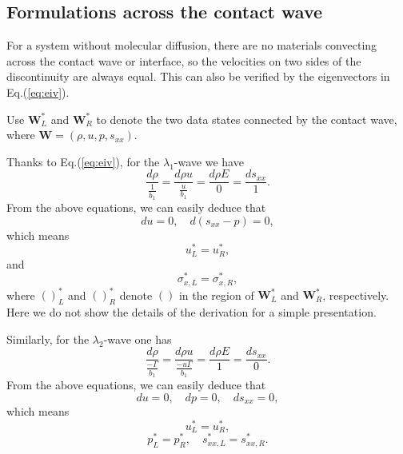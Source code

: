 \documentclass[review]{elsarticle}
\begin{document}
\subsection{Formulations across the  contact wave}
  For  a  system without molecular diffusion, there are  no materials convecting  across the contact wave or interface, so the velocities on two sides of  the discontinuity are always equal. %
  This can also be verified by the eigenvectors  in Eq.(\ref{eq:eiv}).

Use $\mathbf{W}_L^*$ and $\mathbf{W}_R^*$ to denote the two data states connected by the contact wave, where $\mathbf{W}=\left(\rho,u,p,s_{xx}\right)$.

Thanks to Eq.(\ref{eq:eiv}), for the $\lambda_{1}$-wave we
have
\begin{equation}   \label{e23a}
\frac{d \rho}{\frac{1}{b_{1}}} = \frac{d \rho u}{\frac{u
}{b_{1}}}=\frac{d \rho E}{0} = \frac{d s_{xx}}{1}.
\end{equation}
From the above equations, we can easily deduce that
\begin{equation}   \label{e23b}
du = 0, \quad d(s_{xx}-p)=0,
\end{equation}
 which means
\begin{equation}   \label{e23c}
  u_{L}^{\ast}=u_{R}^{\ast},
\end{equation}
and
\begin{equation}   \label{e23d}
\sigma_{x,L}^{\ast}=\sigma_{x,R}^{\ast},
\end{equation}
where $()_{L}^{\ast}$ and $()_{R}^{\ast}$ denote $()$ in the region
of $\mathbf{W}_{L}^{\ast}$ and $\mathbf{W}_{R}^{\ast}$,
respectively. Here we do not show the details of the derivation for a simple
 presentation.


Similarly, for the $\lambda_{2}$-wave one
has
\begin{equation}   \label{e24a}
\frac{d \rho}{\frac{-\Gamma}{b_{1}}} = \frac{d \rho u}{\frac{-u
\Gamma}{b_{1}}}=\frac{d \rho E}{1} = \frac{d s_{xx}}{0}.
\end{equation}
From the above equations, we can easily deduce  that
\begin{equation}   \label{e24b}
du = 0, \quad dp=0, \quad ds_{xx}=0,
\end{equation}
 which means
\begin{equation}   \label{e24c}
  u_{L}^{\ast}=u_{R}^{\ast},
\end{equation}
\begin{equation}   \label{e24d}
p_{L}^{\ast}=p_{R}^{\ast}, \quad
  s_{xx,L}^{\ast}=s_{xx,R}^{\ast}.
\end{equation}
\end{document}
